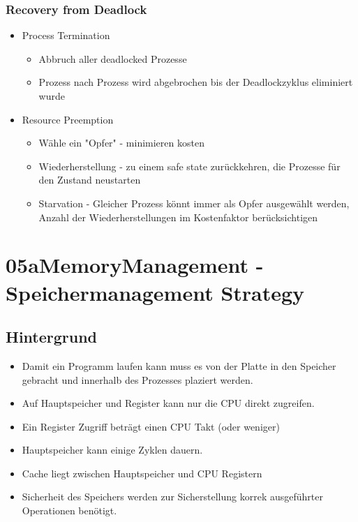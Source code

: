 \documentclass[a4paper]{scrreprt}
\begin{document}
	\subsection{Recovery from Deadlock}
				\begin{itemize}
					\item Process Termination
						\begin{itemize}
							\item Abbruch aller deadlocked Prozesse
							\item Prozess nach Prozess wird abgebrochen bis der Deadlockzyklus eliminiert wurde
						\end{itemize}
					\item Resource Preemption
						\begin{itemize}
							\item Wähle ein "Opfer" - minimieren kosten
							\item Wiederherstellung - zu einem safe state zurückkehren, die Prozesse für den Zustand neustarten
							\item Starvation - Gleicher Prozess könnt immer als Opfer ausgewählt werden, Anzahl der Wiederherstellungen im Kostenfaktor berücksichtigen
						\end{itemize}
				\end{itemize}

\chapter{05aMemoryManagement - Speichermanagement Strategy}
\section{Hintergrund}
\begin{itemize}
\item Damit ein Programm laufen kann muss es von der Platte in den Speicher gebracht und innerhalb des Prozesses plaziert werden.

\item Auf Hauptspeicher und Register kann nur die CPU direkt zugreifen.

\item Ein Register Zugriff beträgt einen CPU Takt (oder weniger)

\item Hauptspeicher kann einige Zyklen dauern.

\item Cache liegt zwischen Hauptspeicher und CPU Registern

\item Sicherheit des Speichers werden zur Sicherstellung korrek ausgeführter Operationen benötigt.

\end{itemize}
\end{document}
